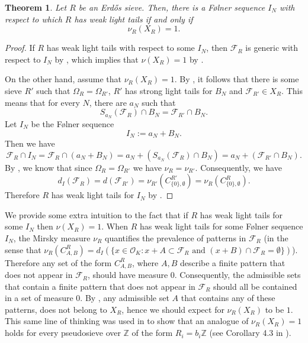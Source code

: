 \documentclass[a4paper,11pt,reqno]{amsart}
\theoremstyle{plain}
\newtheorem{theorem}{Theorem}[section]
\theoremstyle{remark}
\newcommand{\z}{\mathbb{Z}}
\newcommand{\co}{\mathcal{O}}
\newcommand{\fr}{\mathcal{F}_R}
\newcommand{\frp}{\mathcal{F}_{R'}}
\begin{document}
			
			
			
			\begin{theorem}
				\label{thm: nu_R(X_R) = 1}
				Let $R$ be an Erdős sieve. Then, there is a Følner sequence $I_N$ with respect to which $R$ has weak light tails if and only if $$\nu_R(X_R) = 1.$$
				
			\end{theorem}
			
			\begin{proof}
				If $R$ has weak light tails with respect to some $I_N$, then $\fr$ is generic with respect to $I_N$ by  , which implies that $\nu(X_R) = 1$ by  .
				
				On the other hand, assume that $\nu_R(X_R) = 1$. By , it follows that there is some sieve $R'$ such that $\Omega_R = \Omega_{R'}$, $R'$ has strong light tails for $B_N$ and $\frp \in X_R$. This means that for every $N$, there are $a_N$ such that $$S_{a_N}(\fr)\cap B_N = \frp \cap B_N. $$ Let $I_N$ be the Følner sequence $$I_N:= a_N+B_N.$$ Then we have $$\fr \cap I_N = \fr \cap (a_N+B_N) = a_N + (S_{a_N}(\fr) \cap  B_N) = a_N + (\frp \cap B_N).$$ By  , we know that since $\Omega_R = \Omega_{R'}$ we have $\nu_R = \nu_{R'}$. Consequently,  we have $$d_I(\fr) = d(\frp)  = \nu_{R'}(C^{R'}_{\{0\},\emptyset}) = \nu_R(C^R_{\{0\},\emptyset}) .$$ Therefore $R$ has weak light tails for $I_N$ by  .		
			\end{proof}   
			
			
			
			We provide some extra intuition to the fact that if $R$ has weak light tails for some $I_N$ then $\nu(X_R) = 1$. When $R$ has weak light tails for some Følner sequence $I_N$, the Mirsky measure $\nu_{R}$ quantifies the prevalence of patterns in $\fr$ (in the sense that $\nu_R(C^R_{A,B}) = d_I(\{x\in \co_K: x+A \subset \fr \text{ and } (x+B)\cap \fr = \emptyset\})$). Therefore any set of the form $C^R_{A,B}$, where $A,B$ describe a finite pattern that does not appear in $\fr$, should have measure $0$. Consequently, the admissible sets that contain a finite pattern that does not appear in $\fr$ should all be contained in a set of measure $0$. By , any admissible set $A$ that contains any of these patterns, does not belong to $X_R$, hence we should expect for $\nu_R(X_R)$ to be $1$. This same line of thinking was used in \cite{Dymek} to show that an analogue of $\nu_R(X_R) =1$ holds for every pseudosieve over $\z$ of the form $R_i = b_i\z$ (see Corollary 4.3 in \cite{Dymek}). 
			
\end{document}
